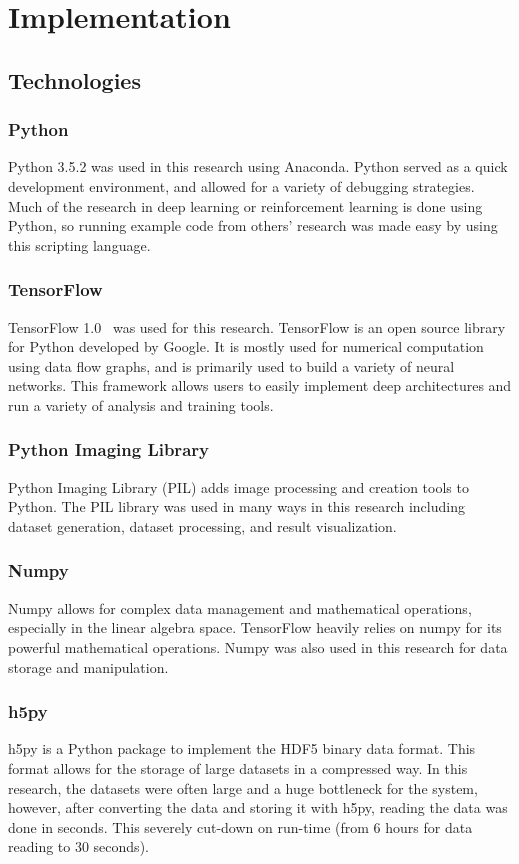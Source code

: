 \documentclass[12pt,american]{report}
\begin{document}
\chapter{Implementation}
\label{sec:implementation}
\section{Technologies}
\subsection{Python}
Python 3.5.2 was used in this research using Anaconda.  Python served as a quick development environment, and allowed for a variety of debugging strategies.  Much of the research in deep learning or reinforcement learning is done using Python, so running example code from others' research was made easy by using this scripting language.
\subsection{TensorFlow}
TensorFlow 1.0~\cite{tensorflow2015-whitepaper} was used for this research.  TensorFlow is an open source library for Python developed by Google.  It is mostly used for numerical computation using data flow graphs, and is primarily used to build a variety of neural networks.  This framework allows users to easily implement deep architectures and run a variety of analysis and training tools.  
\subsection{Python Imaging Library}
Python Imaging Library (PIL) adds image processing and creation tools to Python. The PIL library was used in many ways in this research including dataset generation, dataset processing, and result visualization.
\subsection{Numpy}
Numpy allows for complex data management and mathematical operations, especially in the linear algebra space.  TensorFlow heavily relies on numpy for its powerful mathematical operations.  Numpy was also used in this research for data storage and manipulation. 
\subsection{h5py}
h5py is a Python package to implement the HDF5 binary data format.  This format allows for the storage of large datasets in a compressed way.  In this research, the datasets were often large and a huge bottleneck for the system, however, after converting the data and storing it with h5py, reading the data was done in seconds.  This severely cut-down on run-time (from 6 hours for data reading to 30 seconds). 
\end{document}
